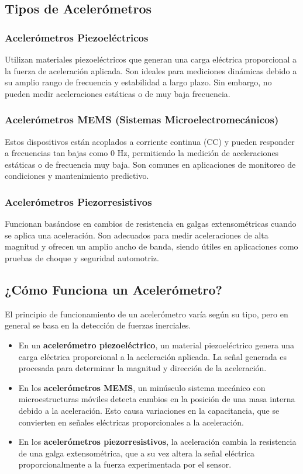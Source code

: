 \documentclass{article}
\begin{document}
	\subsection{Tipos de Acelerómetros}
	\subsubsection{Acelerómetros Piezoeléctricos}
	Utilizan materiales piezoeléctricos que generan una carga eléctrica proporcional a la fuerza de aceleración aplicada. Son ideales para mediciones dinámicas debido a su amplio rango de frecuencia y estabilidad a largo plazo. Sin embargo, no pueden medir aceleraciones estáticas o de muy baja frecuencia.
	
	\subsubsection{Acelerómetros MEMS (Sistemas Microelectromecánicos)}
	Estos dispositivos están acoplados a corriente continua (CC) y pueden responder a frecuencias tan bajas como 0 Hz, permitiendo la medición de aceleraciones estáticas o de frecuencia muy baja. Son comunes en aplicaciones de monitoreo de condiciones y mantenimiento predictivo.
	
	\subsubsection{Acelerómetros Piezorresistivos}
	Funcionan basándose en cambios de resistencia en galgas extensométricas cuando se aplica una aceleración. Son adecuados para medir aceleraciones de alta magnitud y ofrecen un amplio ancho de banda, siendo útiles en aplicaciones como pruebas de choque y seguridad automotriz.
	
	\subsection{¿Cómo Funciona un Acelerómetro?}
	El principio de funcionamiento de un acelerómetro varía según su tipo, pero en general se basa en la detección de fuerzas inerciales.  
	
	\begin{itemize}
		\item En un \textbf{acelerómetro piezoeléctrico}, un material piezoeléctrico genera una carga eléctrica proporcional a la aceleración aplicada. La señal generada es procesada para determinar la magnitud y dirección de la aceleración.
		
		\item En los \textbf{acelerómetros MEMS}, un minúsculo sistema mecánico con microestructuras móviles detecta cambios en la posición de una masa interna debido a la aceleración. Esto causa variaciones en la capacitancia, que se convierten en señales eléctricas proporcionales a la aceleración.
		
		\item En los \textbf{acelerómetros piezorresistivos}, la aceleración cambia la resistencia de una galga extensométrica, que a su vez altera la señal eléctrica proporcionalmente a la fuerza experimentada por el sensor.
	\end{itemize}
	
\end{document}
